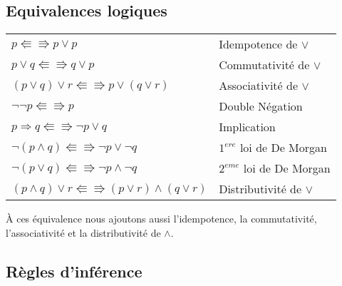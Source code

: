 \subsection{Equivalences logiques}
			\begin{center}
			\begin{tabular}{ll}
			$p \Lleftarrow \Rrightarrow p \lor p$ & Idempotence de $\lor$\\
			$p \lor q \Lleftarrow \Rrightarrow q \lor p$ & Commutativité de $\lor$\\
			$(p \lor q) \lor r \Lleftarrow \Rrightarrow p \lor (q \lor r)$ & Associativité de $\lor$\\
			$ \lnot \lnot p \Lleftarrow \Rrightarrow p$ & Double Négation\\
			$p \Rightarrow q \Lleftarrow \Rrightarrow \lnot p \lor q$ & Implication\\
			$\lnot (p \land q) \Lleftarrow \Rrightarrow \lnot p \lor \lnot q$ & $1^{ere}$ loi de De Morgan\\
			$\lnot (p \lor q) \Lleftarrow \Rrightarrow \lnot p \land \lnot q$ & $2^{eme}$ loi de De Morgan\\
			$(p \land q) \lor r \Lleftarrow \Rrightarrow (p \lor r) \land (q \lor r)$ & Distributivité de $\lor$\\
			\end{tabular}
			\end{center}
À ces équivalence nous ajoutons aussi l'idempotence, la commutativité, l'associativité et
la distributivité de $\land$.\\
			
\subsection{Règles d'inférence}
		
